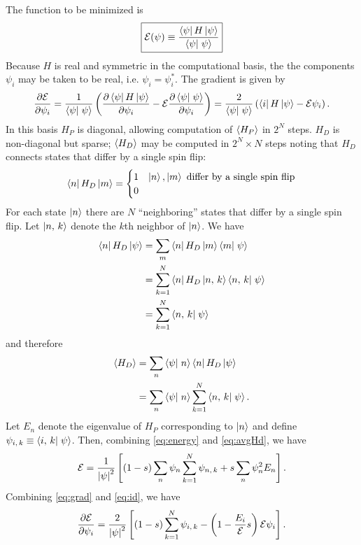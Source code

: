 The function to be minimized is
\begin{equation}
  \boxed{
  \mathcal{E}(\psi) 
  \equiv \frac{\matrixel{\psi}{H}{\psi}}{\braket{\psi}{\psi}}
  }
  \label{eq:energy}
\end{equation}
Because $H$ is real and symmetric in the computational basis, the the
components $\psi_i$ may be taken to be real, i.e.
$\psi_i = \psi_i^*$.
The gradient is given by
\begin{equation}
  \pd{\mathcal{E}}{\psi_i}
  = \frac{1}{\braket{\psi}{\psi}}
  \left( \pd{\matrixel{\psi}{H}{\psi}}{\psi_i} - \mathcal{E} \pd{\braket{\psi}{\psi}}{\psi_i} \right)
  = \frac{2}{\braket{\psi}{\psi}}
  \left( \matrixel{i}{H}{\psi} - \mathcal{E} \psi_i \right).
  \label{eq:grad}
\end{equation}
In this basis $H_P$ is diagonal, allowing computation of $\left< H_P \right>$ in $2^N$
steps. $H_D$ is non-diagonal but sparse; $\left< H_D \right>$ may be computed in $2^N
\times N$ steps noting that $H_D$ connects states that differ by a single spin
flip:
\begin{equation}
  \matrixel{n}{H_D}{m}
  = \begin{cases}
    1 & \ket{n}, \ket{m} \text{ differ by a single spin flip} \\
    0
  \end{cases}
  \label{}
\end{equation}
For each state $\left| n \right>$ there are $N$ ``neighboring'' states that differ by a
single spin flip. Let $\left| n,\,k \right>$ denote the $k$th neighbor of
$\left| n \right>$. We have
\begin{align}
  \matrixel{n}{H_D}{\psi}
  &= \sum_m \matrixel{n}{H_D}{m} \braket{m}{\psi} \\
  &= \sum_{k=1}^N \matrixel{n}{H_D}{\nghbr{n}{k}} \braket{\nghbr{n}{k}}{\psi} \\
  &= \sum_{k=1}^N \braket{\nghbr{n}{k}}{\psi}
  \label{eq:id}
\end{align}
and therefore
\begin{align}
  \avg{H_D}
  &= \sum_n \braket{\psi}{n} \matrixel{n}{H_D}{\psi} \\
  &= \sum_n \braket{\psi}{n} \sum_{k=1}^{N} \braket{\nghbr{n}{k}}{\psi}.
  \label{eq:avgHd}
\end{align}
Let $E_n$ denote the eigenvalue of $H_P$ corresponding to $\left| n \right>$ and define
$\psi_{\nghbr{i}{k}} \equiv \braket{\nghbr{i}{k}}{\psi}$.
Then, combining \eqref{eq:energy} and \eqref{eq:avgHd}, we have
\begin{equation}
  \mathcal{E}
  = \frac{1}{\left| \psi \right|^2}
  \left[
  (1-s) \sum_n \psi_n \sum_{k=1}^N \psi_{n,\,k}
  + s \sum_n \psi_n^2 E_n
  \right].
  \label{}
\end{equation}
Combining \eqref{eq:grad} and \eqref{eq:id}, we have 
\begin{equation}
  \frac{\partial \mathcal{E}}{\partial \psi_i}
  = \frac{2}{\left| \psi \right|^2}
  \left[
      (1-s) \sum_{k=1}^N \psi_{i,\,k}
    - \left( 1 - \frac{E_i}{\mathcal{E}} s \right) \mathcal{E} \psi_i
  \right].
\end{equation}
